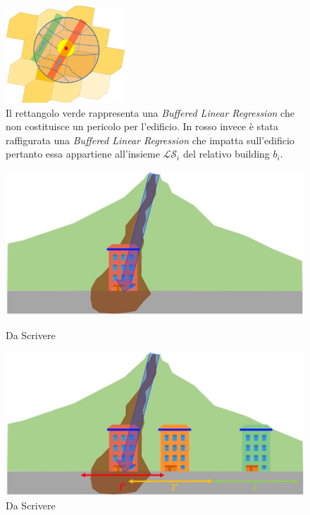 \begin{enumerate}
	\begin{figure}[h]
		\centering
		\includegraphics[width=0.4\textwidth]{images/landslides}
		\caption{Il rettangolo verde rappresenta una \textit{Buffered Linear Regression} che non costituisce un pericolo per l'edificio. In rosso invece è stata raffigurata una \textit{Buffered Linear Regression} che impatta sull'edificio pertanto essa appartiene all'insieme $\mathcal{LS}_i$ del relativo building $b_i$.}
	\label{landslides}
	\end{figure}
	

\begin{figure}[h]
	\hspace{0.05\linewidth}
	\begin{minipage}[t]{0.4\linewidth}
		\centering
		\includegraphics[width=\textwidth]{images/landslide2}
		\caption{Da Scrivere}
		\label{landslide2}
	\end{minipage}
	\hspace{0.05\linewidth}
	\begin{minipage}[t]{0.4\linewidth}
		\centering
		\includegraphics[width=\textwidth]{images/landslide3}
		\caption{Da Scrivere }
		\label{landslide3}
	\end{minipage}
\end{figure}
	
\end{enumerate}

